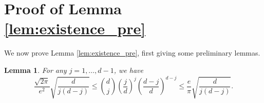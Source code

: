 \documentclass[onecolumn,letterpaper]{IEEEtran}
\newtheorem{lemma}{Lemma}
\begin{document}

\section{Proof of Lemma \ref{lem:existence_pre}}
\label{proof:lem:existence_pre}

We now prove Lemma \ref{lem:existence_pre}, first giving some preliminary lemmas. 
\begin{lemma} \label{lem:stirling}
For any $j=1,\dots,d-1$, we have
\begin{equation*}
\frac{\sqrt{2\pi}}{e^2} \sqrt{\frac{d}{j(d-j)}} \leq \binom{d}{j} \left( \frac{j}{d} \right)^j \left( \frac{d-j}{d} \right)^{d-j} \leq \frac{e}{\pi} \sqrt{\frac{d}{j(d-j)}}.
\end{equation*}
\end{lemma}
\end{document}
